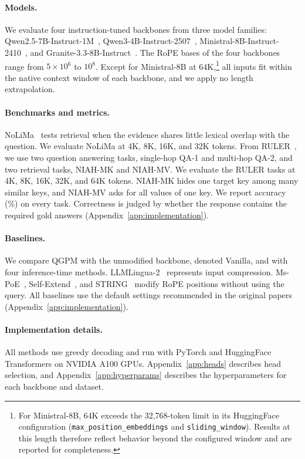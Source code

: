 \documentclass[11pt]{article}
\begin{document}
\paragraph{Models.}
We evaluate four instruction-tuned backbones from three model families: Qwen2.5-7B-Instruct-1M~\citep{yang2025qwen251m}, Qwen3-4B-Instruct-2507~\citep{yang2025qwen3}, Ministral-8B-Instruct-2410~\citep{mistral2024ministraux}, and Granite-3.3-8B-Instruct~\citep{ibm2025granite33}. The RoPE bases of the four backbones range from $5 \times 10^6$ to $10^8$. Except for Ministral-8B at 64K,\footnote{For Ministral-8B, 64K exceeds the 32,768-token limit in its HuggingFace configuration (\texttt{max\_\allowbreak position\_\allowbreak embeddings} and \texttt{sliding\_\allowbreak window}). Results at this length therefore reflect behavior beyond the configured window and are reported for completeness.} all inputs fit within the native context window of each backbone, and we apply no length extrapolation.

\paragraph{Benchmarks and metrics.}
NoLiMa~\citep{modarressi2025nolima} tests retrieval when the evidence shares little lexical overlap with the question. We evaluate NoLiMa at 4K, 8K, 16K, and 32K tokens. From RULER~\citep{hsieh2024ruler}, we use two question answering tasks, single-hop QA-1 and multi-hop QA-2, and two retrieval tasks, NIAH-MK and NIAH-MV. We evaluate the RULER tasks at 4K, 8K, 16K, 32K, and 64K tokens. NIAH-MK hides one target key among many similar keys, and NIAH-MV asks for all values of one key. We report accuracy (\%) on every task. Correctness is judged by whether the response contains the required gold answers (Appendix~\ref{app:implementation}).

\paragraph{Baselines.}
We compare QGPM with the unmodified backbone, denoted Vanilla, and with four inference-time methods. LLMLingua-2~\citep{pan2024llmlingua2} represents input compression. Ms-PoE~\citep{zhang2024found}, Self-Extend~\citep{jin2024llm}, and STRING~\citep{an2025why} modify RoPE positions without using the query. All baselines use the default settings recommended in the original papers (Appendix~\ref{app:implementation}).

\paragraph{Implementation details.}
All methods use greedy decoding and run with PyTorch and HuggingFace Transformers on NVIDIA A100 GPUs. Appendix~\ref{app:heads} describes head selection, and Appendix~\ref{app:hyperparams} describes the hyperparameters for each backbone and dataset.
\end{document}
